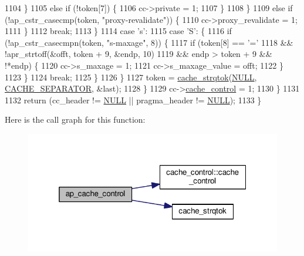 \begin{DoxyCode}
1104                     \}
1105                     \textcolor{keywordflow}{else} \textcolor{keywordflow}{if} (!token[7]) \{
1106                         cc->private = 1;
1107                     \}
1108                 \}
1109                 \textcolor{keywordflow}{else} \textcolor{keywordflow}{if} (!ap\_cstr\_casecmp(token, \textcolor{stringliteral}{"proxy-revalidate"})) \{
1110                     cc->proxy\_revalidate = 1;
1111                 \}
1112                 \textcolor{keywordflow}{break};
1113             \}
1114             \textcolor{keywordflow}{case} \textcolor{charliteral}{'s'}:
1115             \textcolor{keywordflow}{case} \textcolor{charliteral}{'S'}: \{
1116                 \textcolor{keywordflow}{if} (!ap\_cstr\_casecmpn(token, \textcolor{stringliteral}{"s-maxage"}, 8)) \{
1117                     \textcolor{keywordflow}{if} (token[8] == \textcolor{charliteral}{'='}
1118                             && !apr\_strtoff(&offt, token + 9, &endp, 10)
1119                             && endp > token + 9 && !*endp) \{
1120                         cc->s\_maxage = 1;
1121                         cc->s\_maxage\_value = offt;
1122                     \}
1123                 \}
1124                 \textcolor{keywordflow}{break};
1125             \}
1126             \}
1127             token = \hyperlink{group__Cache__util_gada03570414af2b2d9349449858036d90}{cache\_strqtok}(\hyperlink{pcre_8txt_ad7f989d16aa8ca809a36bc392c07fba1}{NULL}, \hyperlink{group__Cache__util_ga2916636af38fdf277cb80c1c698c291a}{CACHE\_SEPARATOR}, &last);
1128         \}
1129         cc->\hyperlink{structcache__control_ab54624480acafa695556a98b70938413}{cache\_control} = 1;
1130     \}
1131 
1132     \textcolor{keywordflow}{return} (cc\_header != \hyperlink{pcre_8txt_ad7f989d16aa8ca809a36bc392c07fba1}{NULL} || pragma\_header != \hyperlink{pcre_8txt_ad7f989d16aa8ca809a36bc392c07fba1}{NULL});
1133 \}
\end{DoxyCode}


Here is the call graph for this function\+:
\nopagebreak
\begin{figure}[H]
\begin{center}
\leavevmode
\includegraphics[width=319pt]{group__MOD__CACHE_ga22e3955e21c6e60450101eb1e3c6919b_cgraph}
\end{center}
\end{figure}




